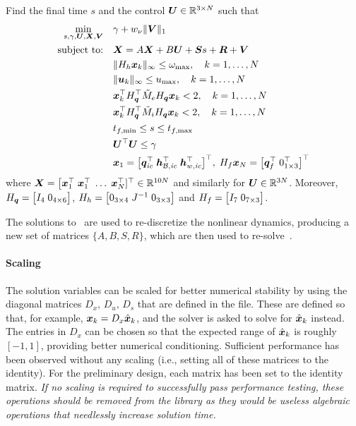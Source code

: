 \documentclass[10pt]{article}
\begin{document}
\begin{problem}\label{prob:prob2}
Find the final time $s$ and the control $\bm{U}\in{\mathbb{R}}^{3 \times N}$ such that
\begin{subequations}\label{eq:prob2}
\begin{align}
\min_{s,\gamma,\bm{U},\bm{X},\bm{V}} &\quad \gamma + w_{\nu} \| \bm{V} \|_1 \label{eq:p2_a}\\
\text{subject to:} &\quad \bm{X} = A \bm{X} + B \bm{U} + \bm{S} s + \bm{R} + \bm{V} \label{eq:p2_b}\\
&\quad \| H_h \bm{x}_k \|_{\infty} \leq \omega_{\max}, \quad k=1,\ldots,N \label{eq:p2_c}\\ 
&\quad \| \bm{u}_k \|_{\infty} \leq u_{\max}, \quad k=1,\ldots,N \label{eq:p2_d}\\
&\quad \bm{x}_k^{\top} H_{\bm{q}}^{\top} \tilde{M}_e H_{\bm{q}} \bm{x}_k < 2, \quad k=1,\ldots,N \label{eq:p2_e}\\
&\quad \bm{x}_k^{\top} H_{\bm{q}}^{\top} \tilde{M}_i H_{\bm{q}} \bm{x}_k < 2, \quad k=1,\ldots,N \label{eq:p2_f}\\
&\quad t_{f,\min} \leq s \leq t_{f,\max} \label{eq:p2_g} \\
&\quad \bm{U}^{\top}\bm{U} \leq \gamma \label{eq:p2_cost} \\ 
&\quad \bm{x}_1 = \big[ \bm{q}_\textit{ic}^{\top} \; \bm{h}_{\mathcal{B},\textit{ic}}^{\top} \; \bm{h}_{w,\textit{ic}}^{\top} \big]^{\top}, \; H_f \bm{x}_N = \big[ \bm{q}_f^{\top} \; 0_{1 \times 3} ^{\top} \big]^{\top} \label{eq:p2_h}
\end{align}
\end{subequations}
where $\bm{X} = \big[ \bm{x}_1^{\top} \; \bm{x}_1^{\top} \; \ldots \; \bm{x}_{N}^{\top} ]^{\top} \in {\mathbb{R}}^{10N}$ and similarly for $\bm{U}\in{\mathbb{R}}^{3N}$. Moreover, $H_{\bm{q}} = \big[ I_{4} \; 0_{4 \times 6} \big]$, $H_h = \big[ 0_{3 \times 4} \; J^{-1} \; 0_{3 \times 3} \big]$ and $H_f = \big[ I_{7} \; 0_{7 \times 3} \big]$.
\end{problem}
The solutions to~ are used to re-discretize the nonlinear dynamics, producing a new set of matrices $\{A,B,S,R\}$, which are then used to re-solve~.

\paragraph{Scaling}
The solution variables can be scaled for better numerical stability by using the diagonal matrices $D_x,\,D_u,\,D_s$ that are defined in the  file. These are defined so that, for example, $\bm{x}_k = D_x \hat{\bm{x}}_{k}$, and the solver is asked to solve for $\hat{\bm{x}}_k$ instead. The entries in $D_x$ can be chosen so that the expected range of $\hat{\bm{x}}_k$ is roughly $[-1,1]$, providing better numerical conditioning. Sufficient performance has been observed without any scaling (i.e., setting all of these matrices to the identity). For the preliminary design, each matrix has been set to the identity matrix. \textit{If no scaling is required to successfully pass performance testing, these operations should be removed from the library as they would be useless algebraic operations that needlessly increase solution time.} 
\end{document}
